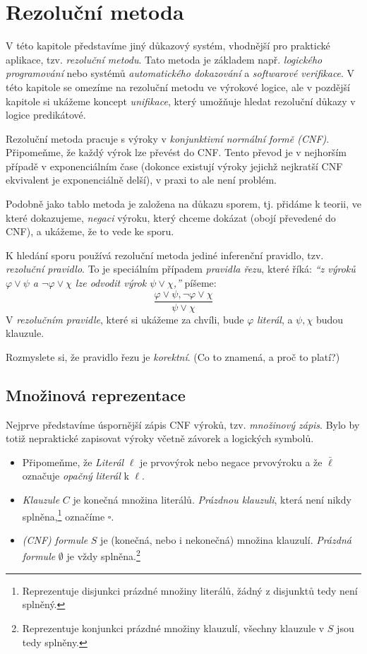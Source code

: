 \chapter{Rezoluční metoda}

V této kapitole představíme jiný důkazový systém, vhodnější pro praktické aplikace,  tzv. \emph{rezoluční metodu}. Tato metoda je základem např. \emph{logického programování} nebo systémů \emph{automatického dokazování} a \emph{softwarové verifikace}. V této kapitole se omezíme na rezoluční metodu ve výrokové logice, ale v pozdější kapitole si ukážeme koncept \emph{unifikace}, který umožňuje hledat rezoluční důkazy v logice predikátové.

Rezoluční metoda pracuje s výroky v \emph{konjunktivní normální formě (CNF)}. Připomeňme, že každý výrok lze převést do CNF. Tento převod je v nejhorším případě v exponenciálním čase (dokonce existují výroky jejichž nejkratší CNF ekvivalent je exponenciálně delší), v praxi to ale není problém.

Podobně jako tablo metoda je založena na důkazu sporem, tj. přidáme k teorii, ve které dokazujeme, \emph{negaci} výroku, který chceme dokázat (obojí převedené do CNF), a ukážeme, že to vede ke sporu.

K hledání sporu používá rezoluční metoda jediné inferenční pravidlo, tzv. \emph{rezoluční pravidlo}. To je speciálním případem \emph{pravidla řezu}, které říká: \emph{``z výroků $\varphi\lor\psi$ a $\neg\varphi\lor\chi$ lze odvodit výrok $\psi\lor\chi$,''} píšeme:
$$
\frac{\varphi\lor\psi,\neg\varphi\lor\chi}{\psi\lor\chi}
$$
V \emph{rezolučním pravidle}, které si ukážeme za chvíli, bude $\varphi$ \emph{literál}, a $\psi,\chi$ budou {klauzule}. 

\begin{exercise}
Rozmyslete si, že pravidlo řezu je \emph{korektní}. (Co to znamená, a proč to platí?)
\end{exercise}

\section{Množinová reprezentace}

Nejprve představíme úspornější zápis CNF výroků, tzv. \emph{množinový zápis}. Bylo by totiž nepraktické zapisovat výroky včetně závorek a logických symbolů.
\begin{itemize}
    \item Připomeňme, že \emph{Literál} $\ell$ je prvovýrok nebo negace prvovýroku  a že $\bar \ell$ označuje \emph{opačný literál} k $\ell$.
    \item \emph{Klauzule} $C$ je konečná množina literálů. \emph{Prázdnou klauzuli}, která není nikdy splněna,\footnote{Reprezentuje disjunkci prázdné množiny literálů, žádný z disjunktů tedy není splněný.} označíme $\square$.
    \item \emph{(CNF) formule} $S$ je (konečná, nebo i nekonečná) množina klauzulí. \emph{Prázdná formule} $\emptyset$ je vždy splněna.\footnote{Reprezentuje konjunkci prázdné množiny klauzulí, všechny klauzule v $S$ jsou tedy splněny.}
\end{itemize}

